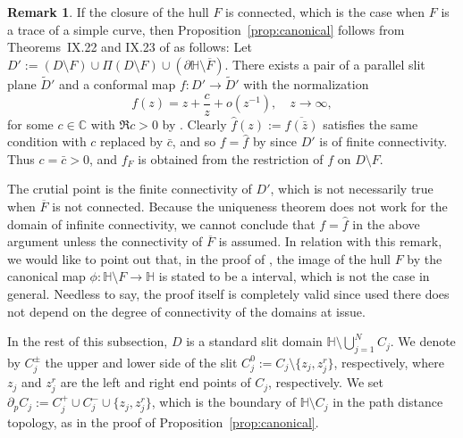 \documentclass[preprint,12pt]{elsarticle}
\theoremstyle{definition}
\newtheorem{rem}[thm]{Remark}
\newcommand{\C}{\mathbb{C}}
\newcommand{\uhp}{\mathbb{H}}
\begin{document}
\begin{rem} \label{rem:canonical}
If the closure of the hull $F$ is connected,
which is the case when $F$ is a trace of a simple curve,
then Proposition~\ref{prop:canonical} follows from Theorems~IX.22 and IX.23
of \cite{Ts59} as follows:
Let $D':=(D \setminus F) \cup \Pi (D \setminus F)
\cup (\partial \uhp \setminus \overline{F})$.
There exists a pair of a parallel slit plane $\tilde{D}'$ and a conformal map
$f \colon D' \to \tilde{D}'$ with the normalization
\[
f(z)=z + \frac{c}{z} + o(z^{-1}),\quad z \to \infty,
\]
for some $c \in \C$ with $\Re c>0$ by \cite[Theorem~IX.22]{Ts59}.
Clearly $\hat{f}(z):=\overline{f(\bar{z})}$ satisfies the same condition
with $c$ replaced by $\bar{c}$, and so $f=\hat{f}$ by \cite[Theorem~IX.23]{Ts59}
since $D'$ is of finite connectivity.
Thus $c=\bar{c}>0$, and
$f_F$ is obtained from the restriction of $f$ on $D \setminus F$.

The crutial point is the finite connectivity of $D'$,
which is not necessarily true when $\overline{F}$ is not connected.
Because the uniqueness theorem \cite[Theorem~IX.23]{Ts59} does not work
for the domain of infinite connectivity,
we cannot conclude that $f=\hat{f}$ in the above argument
unless the connectivity of $\overline{F}$ is assumed.
In relation with this remark, we would like to point out that,
in the proof of \cite[Theorem~7.2]{CFR16}, the image of the hull $F$
by the canonical map $\phi \colon \uhp \setminus F \to \uhp$
is stated to be a interval, which is not the case in general.
Needless to say, the proof itself is completely valid since
\cite[Theorem~11.2]{CFR16} used there does not depend on the degree
of connectivity of the domains at issue.
\end{rem}

In the rest of this subsection, $D$ is a standard slit domain
$\uhp \setminus \bigcup_{j=1}^N C_j$.
We denote by $C^{\pm}_j$ the upper and lower side of the slit
$C^0_j:=C_j \setminus \{z_j, z^r_j\}$, respectively,
where $z_j$ and $z^r_j$ are the left and right end points of $C_j$, respectively.
We set $\partial_p C_j := C^+_j \cup C^-_j \cup \{z_j, z^r_j\}$,
which is the boundary of $\uhp \setminus C_j$ in the path distance topology,
as in the proof of Proposition~\ref{prop:canonical}.
\end{document}
